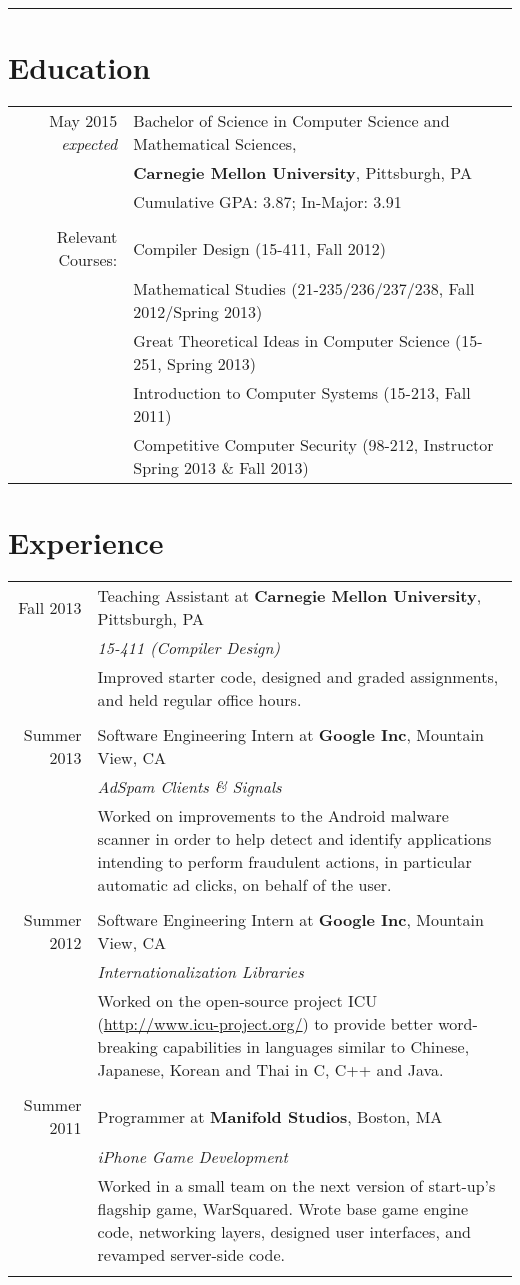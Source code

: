 \documentclass{article}
\newcommand{\job}[6]{#1 & #2 at \textbf{#3}, #4\\ & \emph{#5}\\& \small{#6}\\
    \multicolumn{2}{c}{}\\ }
\begin{document}
\pagestyle{empty}
\par{\bigskip\par}
\hrule
\par{\par}

\section{Education}
\begin{tabular}{rl}
May 2015 {\em expected} & Bachelor of Science in Computer Science and Mathematical Sciences, 
\\ & \textbf{Carnegie Mellon University}, Pittsburgh, PA\\
& Cumulative GPA: 3.87; In-Major: 3.91 \\ &\\
Relevant Courses: & Compiler Design (15-411, Fall 2012) \\
& Mathematical Studies (21-235/236/237/238, Fall 2012/Spring 2013) \\
& Great Theoretical Ideas in Computer Science (15-251, Spring 2013) \\
& Introduction to Computer Systems (15-213, Fall 2011) \\
& Competitive Computer Security (98-212, Instructor Spring 2013 \& Fall 2013)\end{tabular}

\section{Experience}
\begin{tabular}{r|p{}}
\job{Fall 2013}{Teaching Assistant}{Carnegie Mellon University}{Pittsburgh, PA}
{15-411 (Compiler Design)}
{Improved starter code, designed and graded assignments,
and held regular office hours.}
\job{Summer 2013}{Software Engineering Intern}{Google Inc}{Mountain View, CA}
{AdSpam Clients \& Signals}
{Worked on improvements to the Android malware scanner in order to help detect and identify
applications intending to perform fraudulent actions, in particular automatic ad clicks, on behalf
of the user.}
\job{Summer 2012}{Software Engineering Intern}{Google Inc}{Mountain View, CA}
{Internationalization Libraries}
{Worked on the open-source project ICU (\url{http://www.icu-project.org/}) to provide better
word-breaking capabilities in languages similar to Chinese, Japanese, Korean and Thai in C, C++ and
Java.}
\job{Summer 2011}{Programmer}{Manifold Studios}{Boston, MA}{iPhone Game Development}
{Worked in a small team on the next version of start-up's flagship game, WarSquared. Wrote base
game engine code, networking layers, designed user interfaces,
and revamped server-side code.}
\end{tabular}
\end{document}
